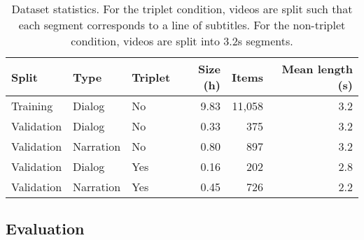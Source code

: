 \begin{table}
  \centering
  \begin{tabular}{lllrrr}
    \toprule
    Split      & Type      & Triplet   & Size (h) & Items & Mean
                                                            length
                                                            (s)\\\midrule
    Training   & Dialog    & No        & 9.83     & 11,058 & 3.2 \\
    Validation & Dialog    & No        & 0.33     & 375    & 3.2 \\
    Validation & Narration & No        & 0.80     & 897    & 3.2 \\
    Validation & Dialog    & Yes       & 0.16     & 202    & 2.8 \\
    Validation & Narration & Yes       & 0.45     & 726    & 2.2 \\
    \bottomrule
  \end{tabular}
  \caption{Dataset statistics. For the triplet condition, videos are
    split such that each segment corresponds to a line of
    subtitles. For the non-triplet condition, videos are split into
    3.2s segments.}
  \label{tab:ds-stat}
\end{table}


\subsection{Evaluation}
\label{sec:eval}
